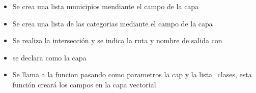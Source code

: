 \documentclass[letterpaper,10pt,spanish]{sphinxmanual}
\begin{document}
\begin{itemize}
\item {} 
Se crea una lista municipios mendiante el campo  de la capa 

\item {} 
Se crea una lista de las categorias mediante el campo  de la capa 

\item {} 
Se realiza la intersección  y  se indica la ruta y nombre de salida con 

\item {} 
se declara  como la capa 

\item {} 
Se llama a la funcion  pasando como parametros la cap   y la lista\_clases, esta función creará los campos en la capa vectorial

\end{itemize}
\end{document}
